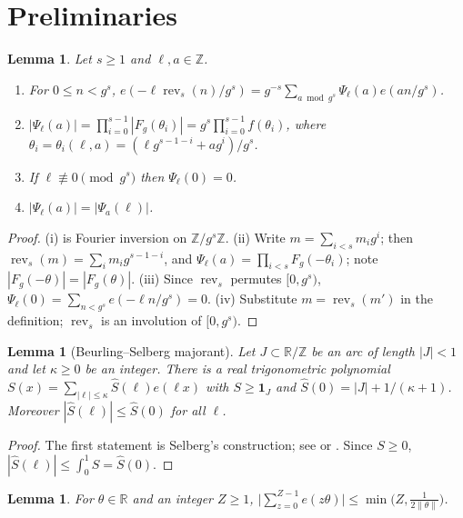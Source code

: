 \documentclass[11pt]{amsart}
\newtheorem{lemma}[theorem]{Lemma}
\theoremstyle{definition}
\numberwithin{equation}{section}
\newcommand{\rev}{\operatorname{rev}}
\newcommand{\Z}{\mathbb{Z}}
\newcommand{\R}{\mathbb{R}}
\begin{document}
\section{Preliminaries}

\begin{lemma}\label{lem:psi}
Let $s\ge1$ and $\ell,a\in\Z$.
\begin{enumerate}[label=\textup{(\roman*)}]
\item For $0\le n<g^s$, $e(-\ell\rev_s(n)/g^s)=g^{-s}\sum_{a\bmod g^s}\Psi_\ell(a)e(an/g^s)$.
\item $|\Psi_\ell(a)|=\prod_{i=0}^{s-1}|F_g(\theta_i)|=g^s\prod_{i=0}^{s-1}f(\theta_i)$, where
$\theta_i=\theta_i(\ell,a)=(\ell g^{s-1-i}+ag^i)/g^s$.
\item If $\ell\not\equiv0\pmod{g^s}$ then $\Psi_\ell(0)=0$.
\item $|\Psi_\ell(a)|=|\Psi_a(\ell)|$.
\end{enumerate}
\end{lemma}

\begin{proof}
(i) is Fourier inversion on $\Z/g^s\Z$. (ii) Write $m=\sum_{i<s}m_ig^i$; then
$\rev_s(m)=\sum_im_ig^{s-1-i}$, and $\Psi_\ell(a)=\prod_{i<s}F_g(-\theta_i)$;
note $|F_g(-\theta)|=|F_g(\theta)|$. (iii) Since $\rev_s$ permutes
$[0,g^s)$, $\Psi_\ell(0)=\sum_{n<g^s}e(-\ell n/g^s)=0$. (iv) Substitute
$m=\rev_s(m')$ in the definition; $\rev_s$ is an involution of $[0,g^s)$.
\end{proof}

\begin{lemma}[Beurling--Selberg majorant]\label{lem:selberg}
Let $J\subset\R/\Z$ be an arc of length $|J|<1$ and let $\kappa\ge0$ be an
integer. There is a real trigonometric polynomial
$S(x)=\sum_{|\ell|\le\kappa}\hat S(\ell)e(\ell x)$ with $S\ge\mathbf 1_J$ and
$\hat S(0)=|J|+1/(\kappa+1)$. Moreover $|\hat S(\ell)|\le\hat S(0)$ for all
$\ell$.
\end{lemma}

\begin{proof}
The first statement is Selberg's construction; see \cite{Va} or
\cite[Chapter~1]{Mo}. Since $S\ge0$, $|\hat S(\ell)|\le\int_0^1S=\hat S(0)$.
\end{proof}

\begin{lemma}\label{lem:geom}
For $\theta\in\R$ and an integer $Z\ge1$,
$\bigl|\sum_{z=0}^{Z-1}e(z\theta)\bigr|\le\min\bigl(Z,\frac1{2\|\theta\|}\bigr)$.
\end{lemma}
\end{document}
